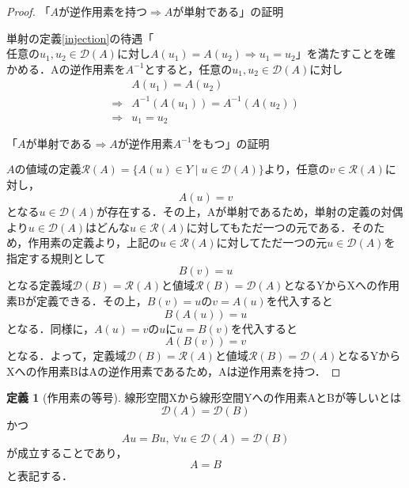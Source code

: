 \documentclass[11pt,a4paper]{jsarticle}
\theoremstyle{definition}
\newtheorem{dfn}{定義}
\begin{document}
\begin{proof}
  「$Aが逆作用素を持つ \Rightarrow Aが単射である$」の証明

  単射の定義\ref{injection}の待遇「$任意のu_1,u_2\in\mathcal{D}(A)に対しA(u_1)=A(u_2) \Rightarrow u_1=u_2$」を満たすことを確かめる．Aの逆作用素を$A^{-1}$とすると，任意の$u_1,u_2\in\mathcal{D}(A)$に対し
  \begin{align*}
                & A(u_1) = A(u_2)               \\
    \Rightarrow & A^{-1}(A(u_1))=A^{-1}(A(u_2)) \\
    \Rightarrow & u_1=u_2
  \end{align*}

  $「Aが単射である\Rightarrow Aが逆作用素A^{-1}をもつ」の証明$

  $A$の値域の定義$\mathcal{R}(A)=\{A(u)\in Y \mid u\in\mathcal{D}(A)\}$より，任意の$v\in\mathcal{R}(A)$に対し，
  \begin{equation*}
    A(u)=v
  \end{equation*}
  となる$u\in\mathcal{D}(A)$が存在する．その上，Aが単射であるため，単射の定義の対偶より$u\in\mathcal{D}(A)$はどんな$u\in\mathcal{R}(A)$に対してもただ一つの元である．そのため，作用素の定義より，上記の$u\in\mathcal{R}(A)$に対してただ一つの元$u\in\mathcal{D}(A)$を指定する規則として
  \begin{equation*}
    B(v)=u
  \end{equation*}
  となる定義域$\mathcal{D}(B)=\mathcal{R}(A)$と値域$\mathcal{R}(B)=\mathcal{D}(A)$となるYからXへの作用素Bが定義できる．その上，$B(v)=u$の$v=A(u)$を代入すると
  \begin{equation*}
    B(A(u))=u
  \end{equation*}
  となる．同様に，$A(u)=v$の$u$に$u=B(v)$を代入すると
  \begin{equation*}
    A(B(v))=v
  \end{equation*}
  となる．よって，定義域$\mathcal{D}(B)=\mathcal{R}(A)$と値域$\mathcal{R}(B)=\mathcal{D}(A)$となるYからXへの作用素BはAの逆作用素であるため，Aは逆作用素を持つ．
\end{proof}

\begin{dfn}[作用素の等号]
  線形空間Xから線形空間Yへの作用素AとBが等しいとは
  \begin{equation*}
    \mathcal{D}(A) = \mathcal{D}(B)
  \end{equation*}
  かつ
  \begin{equation*}
    Au=Bu, \  \forall u\in\mathcal{D}(A)=\mathcal{D}(B)
  \end{equation*}
  が成立することであり，
  \begin{equation*}
    A=B
  \end{equation*}
  と表記する．
\end{dfn}
\end{document}

